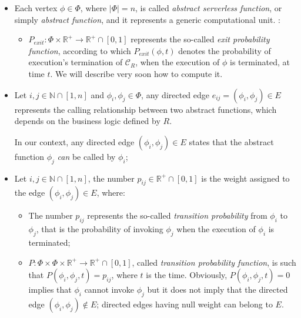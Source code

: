 \documentclass[12pt,a4paper]{report}
\newcommand{\N}{\mathbb{N}}
\newcommand{\Rplus}{\mathbb{R}^+}
\newcommand{\SetFromZeroToOne}{\left[0,1\right]}
\begin{document}
\begin{itemize}
				
	\item Each vertex $\phi \in \Phi$, where $|\Phi| = n$, is called \textit{abstract serverless function}, or simply \textit{abstract  function}, and it represents a generic computational unit. :
	
	\begin{itemize}
				
		\item $P_{exit} : \Phi \times \Rplus \to \Rplus \cap \SetFromZeroToOne$ represents the so-called \textit{exit probability function}, according to which $P_{exit}(\phi,t)$ denotes the probability of execution's termination of $\mathcal{C}_R$, when the execution of $\phi$ is terminated, at time $t$. We will describe very soon how to compute it.
	\end{itemize}
	
	\item Let $i,j \in \N \cap \left[ 1, n \right]$ and $\phi_i, \phi_j \in \Phi$, any directed edge $e_{ij} = \left( \phi_i, \phi_j \right) \in E$ represents the calling relationship between two abstract functions, which depends on the business logic defined by $R$. 
	
	In our context, any directed edge $\left( \phi_i, \phi_j \right) \in E$ states that the abstract function $\phi_j$ \textit{can} be called by $\phi_i$;
	
	\item Let $i,j \in \N \cap \left[ 1, n \right]$, the number $p_{ij} \in \Rplus \cap \SetFromZeroToOne$ is the weight assigned to the edge $\left(\phi_i, \phi_j \right) \in E$, where: 
	
	\begin{itemize}
		
		\item The number $p_{ij}$ represents the so-called \textit{transition probability} from $\phi_i$ to $\phi_j$, that is the probability of invoking $\phi_j$ when the execution of $\phi_i$ is terminated;
		
		\item $P : \Phi \times \Phi \times \Rplus \to \Rplus \cap \left[ 0, 1 \right]$, called \textit{transition probability function}, is such that $P\left(\phi_i, \phi_j, t \right) = p_{ij}$, where $t$ is the time. Obviously, $P\left(\phi_i, \phi_j, t \right) = 0$ implies that $\phi_i$ cannot invoke $\phi_j$ but it does not imply that the directed edge $\left( \phi_i, \phi_j \right) \notin E$; directed edges having null weight can belong to $E$.
		

\end{itemize}
\end{itemize}
\end{document}
